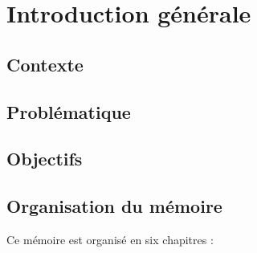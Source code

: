 \chapter*{Introduction générale}
\label{chap:introduction}

\section*{Contexte}

\medskip

\section*{Problématique}



\section*{Objectifs}





\section*{Organisation du mémoire}

Ce mémoire est organisé en six chapitres :

\medskip




